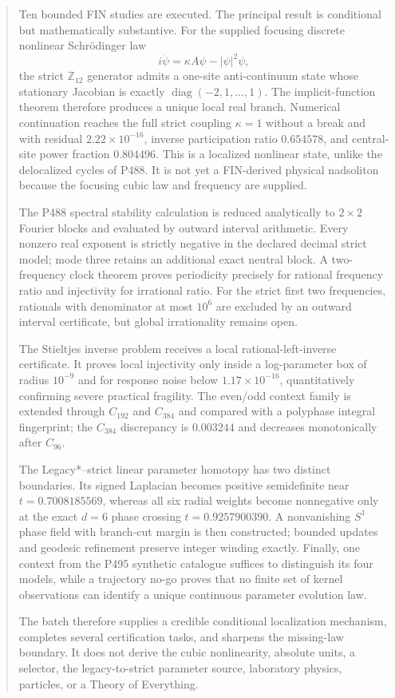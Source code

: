 \documentclass[11pt,a4paper]{article}
\theoremstyle{definition}
\theoremstyle{remark}
\newcommand{\Z}{\mathbb Z}
\begin{document}
\begin{abstract}
Ten bounded FIN studies are executed. The principal result is conditional but mathematically substantive. For the supplied focusing discrete nonlinear Schrödinger law
\[
 i\dot\psi=\kappa A\psi-|\psi|^2\psi,
\]
the strict $\Z_{12}$ generator admits a one-site anti-continuum state whose stationary Jacobian is exactly $\operatorname{diag}(-2,1,\ldots,1)$. The implicit-function theorem therefore produces a unique local real branch. Numerical continuation reaches the full strict coupling $\kappa=1$ without a break and with residual $2.22\times10^{-16}$, inverse participation ratio $0.654578$, and central-site power fraction $0.804496$. This is a localized nonlinear state, unlike the delocalized cycles of P488. It is not yet a FIN-derived physical nadsoliton because the focusing cubic law and frequency are supplied.

The P488 spectral stability calculation is reduced analytically to $2\times2$ Fourier blocks and evaluated by outward interval arithmetic. Every nonzero real exponent is strictly negative in the declared decimal strict model; mode three retains an additional exact neutral block. A two-frequency clock theorem proves periodicity precisely for rational frequency ratio and injectivity for irrational ratio. For the strict first two frequencies, rationals with denominator at most $10^6$ are excluded by an outward interval certificate, but global irrationality remains open.

The Stieltjes inverse problem receives a local rational-left-inverse certificate. It proves local injectivity only inside a log-parameter box of radius $10^{-9}$ and for response noise below $1.17\times10^{-16}$, quantitatively confirming severe practical fragility. The even/odd context family is extended through $C_{192}$ and $C_{384}$ and compared with a polyphase integral fingerprint; the $C_{384}$ discrepancy is $0.003244$ and decreases monotonically after $C_{96}$.

The Legacy*--strict linear parameter homotopy has two distinct boundaries. Its signed Laplacian becomes positive semidefinite near $t=0.7008185569$, whereas all six radial weights become nonnegative only at the exact $d=6$ phase crossing $t=0.9257900390$. A nonvanishing $S^1$ phase field with branch-cut margin is then constructed; bounded updates and geodesic refinement preserve integer winding exactly. Finally, one context from the P495 synthetic catalogue suffices to distinguish its four models, while a trajectory no-go proves that no finite set of kernel observations can identify a unique continuous parameter evolution law.

The batch therefore supplies a credible conditional localization mechanism, completes several certification tasks, and sharpens the missing-law boundary. It does not derive the cubic nonlinearity, absolute units, a selector, the legacy-to-strict parameter source, laboratory physics, particles, or a Theory of Everything.
\end{abstract}
\end{document}
